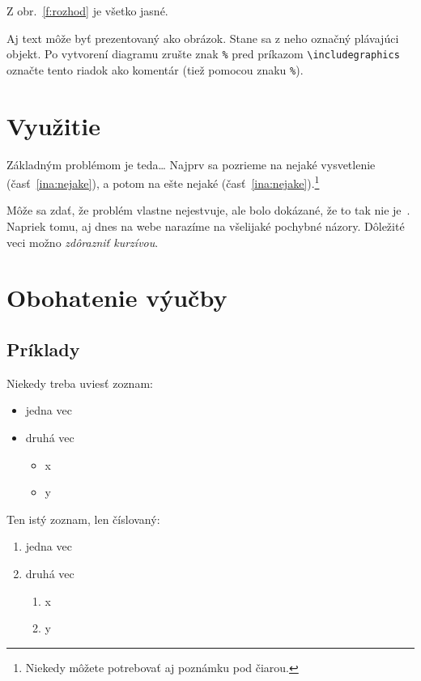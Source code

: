 \documentclass[10pt,twoside,slovak,a4paper]{article}
\begin{document}
Z obr.~\ref{f:rozhod} je všetko jasné. 

\begin{figure*}[tbh]
\centering
Aj text môže byť prezentovaný ako obrázok. Stane sa z neho označný plávajúci objekt. Po vytvorení diagramu zrušte znak \texttt{\%} pred príkazom \verb|\includegraphics| označte tento riadok ako komentár (tiež pomocou znaku \texttt{\%}).
\caption{Rozhodujúci argument.}
\label{f:rozhod}
\end{figure*}



\section{Využitie} \label{vyuzitie}

Základným problémom je teda\ldots{} Najprv sa pozrieme na nejaké vysvetlenie (časť~\ref{ina:nejake}), a potom na ešte nejaké (časť~\ref{ina:nejake}).\footnote{Niekedy môžete potrebovať aj poznámku pod čiarou.}

Môže sa zdať, že problém vlastne nejestvuje\cite{Coplien:MPD}, ale bolo dokázané, že to tak nie je~\cite{Czarnecki:Staged, Czarnecki:Progress}. Napriek tomu, aj dnes na webe narazíme na všelijaké pochybné názory\cite{PLP-Framework}. Dôležité veci možno \emph{zdôrazniť kurzívou}.

\section{Obohatenie výučby} \label{obohatenie}

\subsection{Príklady} \label{obohatenie:priklady}

Niekedy treba uviesť zoznam:

\begin{itemize}
\item jedna vec
\item druhá vec
	\begin{itemize}
	\item x
	\item y
	\end{itemize}
\end{itemize}

Ten istý zoznam, len číslovaný:

\begin{enumerate}
\item jedna vec
\item druhá vec
	\begin{enumerate}
	\item x
	\item y
	\end{enumerate}
\end{enumerate}
\end{document}
